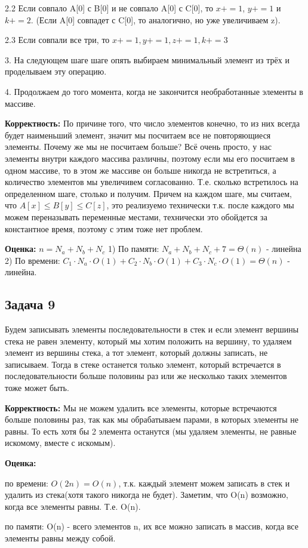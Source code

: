 \documentclass[a4paper,14pt]{article} %
\begin{document}
2.2 Если совпало A[0] с B[0] и не совпало A[0] с C[0], то $x+=1$, $y +=1$ и $k += 2$.
(Если A[0] совпадет с C[0], то аналогично, но уже увеличиваем z).

2.3 Если совпали все три, то $x += 1, y += 1, z += 1, k += 3$

3. На следующем шаге шаге опять выбираем минимальный элемент из трёх и проделываем эту операцию.

4. Продолжаем до того момента, когда не закончится необработанные элементы в массиве.

\textbf{Корректность:} По причине того, что число элементов конечно, то из них всегда будет наименьший элемент, значит мы посчитаем все не повторяющиеся элементы. 
Почему же мы не посчитаем больше? Всё очень просто, у нас элементы внутри каждого массива различны, поэтому если мы его посчитаем в одном массиве, то в этом же массиве он больше никогда не встретиться, а количество элементов мы увеличивем согласованно. Т.е. сколько встретилось на определенном шаге, столько и получим.
Причем на каждом шаге, мы считаем, что $A[x] \leq B[y] \leq C[z]$, это реализуемо технически т.к. после каждого мы можем переназывать переменные местами, технически это обойдется за константное время, поэтому с этим тоже нет проблем.

\textbf{Оценка:} $ n = N_a + N_b + N_c$
1) По памяти: $N_a + N_b + N_c + 7 = \Theta(n)$ - линейна
2) По времени: $C_1 \cdot N_a \cdot O(1) + C_2 \cdot N_b \cdot O(1) + C_3 \cdot N_c \cdot O(1) = \Theta(n)$ - линейна.


\subsection{Задача 9}
Будем записывать элементы последовательности в стек и если элемент вершины стека не равен элементу,  который мы хотим положить на вершину,  то удаляем элемент из вершины стека,  а тот элемент,  который должны записать, не записываем. 
Тогда в стеке останется только элемент, который встречается в последовательности больше половины раз или же несколько таких элементов тоже может быть.

\textbf{Корректность:} Мы не можем удалить все элементы,  которые встречаются больше половины раз, так как мы обрабатываем парами, в которых элементы не равны.
То есть хотя бы 2 элемента останутся (мы удаляем элементы, не равные искомому, вместе с искомым).

\textbf{Оценка:} 

по времени: $O(2n) = O(n)$, т.к. каждый элемент можем записать в стек и удалить из стека(хотя такого никогда не будет). Заметим, что O(n) возможно, когда все элементы равны.
Т.е. O(n).

по памяти: O(n) - всего элементов n,  их все можно записать в массив, когда все элементы равны между собой.
\end{document}
